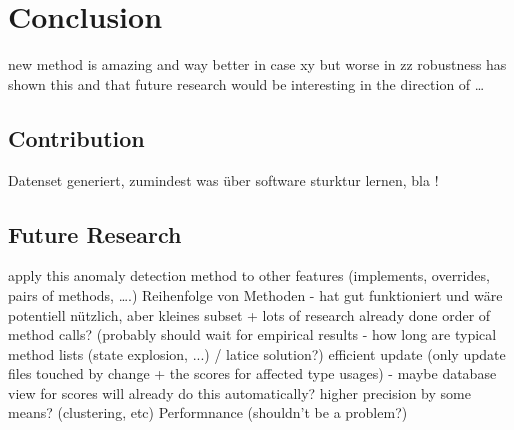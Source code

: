 \chapter{Conclusion}
new method is amazing and way better in case xy but worse in zz
robustness has shown this and that
future research would be interesting in the direction of \ldots

\section{Contribution}
Datenset generiert, zumindest was über software sturktur lernen, bla !

\section{Future Research}
apply this anomaly detection method to other features (implements, overrides, pairs of methods, \ldots.)
Reihenfolge von Methoden - hat gut funktioniert und wäre potentiell nützlich, aber kleines subset + lots of research already done
order of method calls? (probably should wait for empirical results - how long are typical method lists (state explosion, ...) / latice solution?)
efficient update (only update files touched by change + the scores for affected type usages) - maybe database view for scores will already do this automatically? 
higher precision by some means? (clustering, etc)
Performnance (shouldn't be a problem?)

